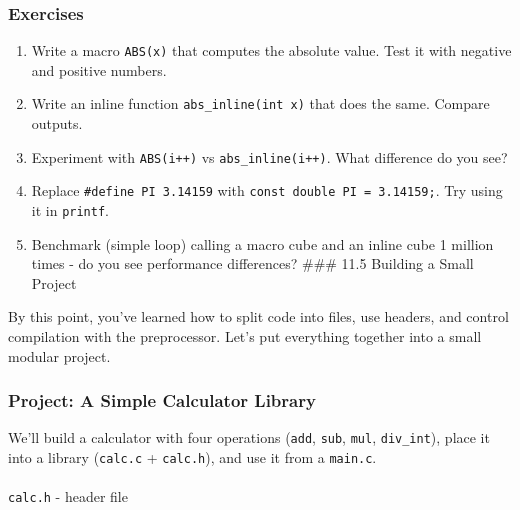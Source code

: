 \documentclass[
  letterpaper,
  DIV=11,
  numbers=noendperiod]{scrreprt}
\makeatletter
\let\oldparagraph\paragraph
\renewcommand{\paragraph}{
    \@ifstar
      \xxxParagraphStar
      \xxxParagraphNoStar
  }
\newcommand{\xxxParagraphStar}[1]{\oldparagraph*{#1}\mbox{}}
\newcommand{\xxxParagraphNoStar}[1]{\oldparagraph{#1}\mbox{}}
\providecommand{\tightlist}{%
  \setlength{\itemsep}{0pt}\setlength{\parskip}{0pt}}
\makeatother
\begin{document}
\subsubsection{Exercises}\label{exercises-53}

\begin{enumerate}
\def\labelenumi{\arabic{enumi}.}
\tightlist
\item
  Write a macro \texttt{ABS(x)} that computes the absolute value. Test
  it with negative and positive numbers.
\item
  Write an inline function \texttt{abs\_inline(int\ x)} that does the
  same. Compare outputs.
\item
  Experiment with \texttt{ABS(i++)} vs \texttt{abs\_inline(i++)}. What
  difference do you see?
\item
  Replace \texttt{\#define\ PI\ 3.14159} with
  \texttt{const\ double\ PI\ =\ 3.14159;}. Try using it in
  \texttt{printf}.
\item
  Benchmark (simple loop) calling a macro cube and an inline cube 1
  million times - do you see performance differences? \#\#\# 11.5
  Building a Small Project
\end{enumerate}

By this point, you've learned how to split code into files, use headers,
and control compilation with the preprocessor. Let's put everything
together into a small modular project.

\subsubsection{Project: A Simple Calculator
Library}\label{project-a-simple-calculator-library}

We'll build a calculator with four operations (\texttt{add},
\texttt{sub}, \texttt{mul}, \texttt{div\_int}), place it into a library
(\texttt{calc.c} + \texttt{calc.h}), and use it from a \texttt{main.c}.

\paragraph{\texorpdfstring{\texttt{calc.h} - header
file}{calc.h - header file}}\label{calc.h---header-file}
\end{document}
